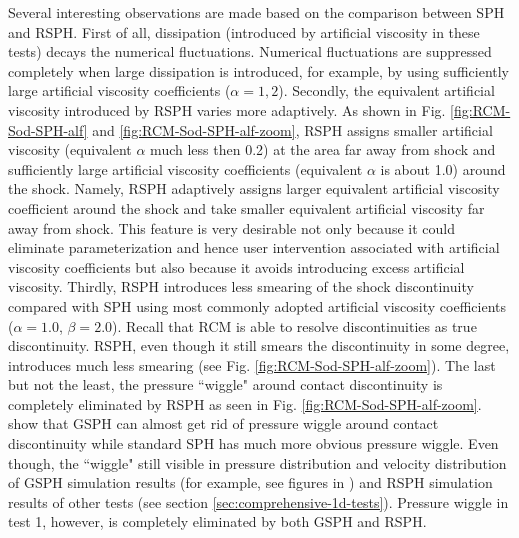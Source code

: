 \documentclass[preprint,12pt,authoryear]{elsarticle}
\begin{document}
Several interesting observations are made based on the comparison between SPH and RSPH.
First of all, dissipation (introduced by artificial viscosity in these tests) decays the numerical fluctuations. Numerical fluctuations are suppressed completely when large dissipation is introduced, for example, by using sufficiently large artificial viscosity coefficients ($\alpha=1,2$).
Secondly, the equivalent artificial viscosity introduced by RSPH varies more adaptively.
As shown in Fig. \ref{fig:RCM-Sod-SPH-alf} and \ref{fig:RCM-Sod-SPH-alf-zoom}, RSPH assigns smaller artificial viscosity (equivalent $\alpha$ much less then 0.2) at the area far away from shock and sufficiently large artificial viscosity coefficients (equivalent $\alpha$ is about 1.0) around the shock. Namely, RSPH adaptively assigns larger equivalent artificial viscosity coefficient around the shock and take smaller equivalent artificial viscosity far away from shock. This feature is very desirable not only because it could eliminate parameterization and hence user intervention associated with artificial viscosity coefficients but also because it avoids introducing excess artificial viscosity.
Thirdly, RSPH introduces less smearing of the shock discontinuity compared with SPH using most commonly adopted artificial viscosity coefficients ($\alpha=1.0$, $\beta=2.0$). Recall that RCM is able to resolve discontinuities as true discontinuity. RSPH, even though it still smears the discontinuity in some degree, introduces much less smearing (see Fig. \ref{fig:RCM-Sod-SPH-alf-zoom}).
The last but not the least, the pressure ``wiggle" around contact discontinuity is completely eliminated by RSPH as seen in Fig. \ref{fig:RCM-Sod-SPH-alf-zoom}. \citet{inutsuka2002reformulation} show that GSPH can almost get rid of pressure wiggle around contact discontinuity while standard SPH has much more obvious pressure wiggle. 
 Even though, the ``wiggle" still visible in pressure distribution and velocity distribution of GSPH simulation results (for example, see figures in \citep{puri2014comparison}) and RSPH simulation results of other tests (see section \ref{sec:comprehensive-1d-tests}). Pressure wiggle in test 1, however, is completely eliminated by both GSPH and RSPH.
\end{document}
